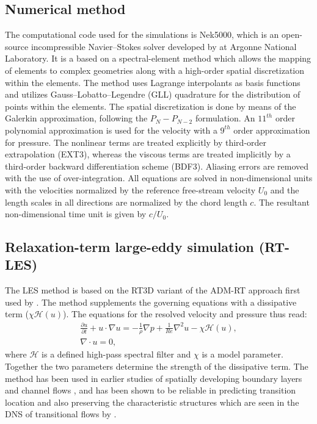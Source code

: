 \subsection{Numerical method}

The computational code used for the simulations is Nek5000, which is an open-source incompressible Navier--Stokes solver developed by \cite{nek5000} at Argonne National Laboratory. It is a based on a spectral-element method which allows the mapping of elements to complex geometries along with a high-order spatial discretization within the elements. The method uses Lagrange interpolants as basis functions and utilizes Gauss--Lobatto--Legendre (GLL) quadrature for the distribution of points within the elements. The spatial discretization is done by means of the Galerkin approximation, following the $P_{N}-P_{N-2}$ formulation. An $11^{th}$ order polynomial approximation is used for the velocity with a $9^{th}$ order approximation for pressure. The nonlinear terms are treated explicitly by third-order extrapolation (EXT3), whereas the viscous terms are treated implicitly by a third-order backward differentiation scheme (BDF3). Aliasing errors are removed with the use of over-integration. All equations are solved in non-dimensional units with the velocities normalized by the reference free-stream velocity $U_{0}$ and the length scales in all directions are normalized by the chord length $c$. The resultant non-dimensional time unit is given by $c/U_{0}$.
\subsection{Relaxation-term large-eddy simulation (RT-LES)}

The LES method is based on the RT3D variant of the ADM-RT approach first used by \cite{schlatter04}. The method supplements the governing equations with a dissipative term ($\chi\mathcal{H}(u)$). The equations for the resolved velocity and pressure thus read:
\begin{subequations}
	\begin{eqnarray}
		\frac{\partial u}{\partial t} + u\cdot\nabla u =  - \frac{1}{\rho}\nabla p + \frac{1}{Re}\nabla^{2}u -\chi\mathcal{H}(u), \\
		\nabla\cdot u = 0,
	\end{eqnarray}
\end{subequations}
where $\mathcal{H}$ is a defined high-pass spectral filter and $\chi$ is a model parameter. Together the two parameters determine the strength of the dissipative term. The method has been used in earlier studies of spatially developing boundary layers \citep{eitel14} and channel flows \citep{schlatter06}, and has been shown to be reliable in predicting transition location and also preserving the characteristic structures which are seen in the DNS of transitional flows by \cite{schlatter06}.


